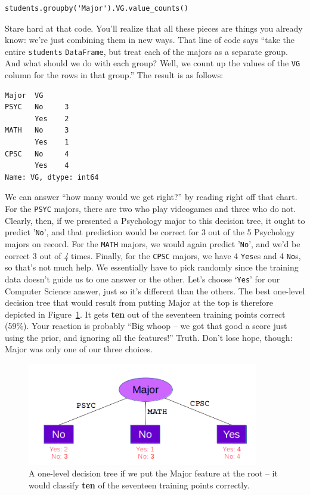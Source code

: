 \begin{Verbatim}[fontsize=\small,samepage=true,frame=single,framesep=3mm]
students.groupby('Major').VG.value_counts()
\end{Verbatim}

Stare hard at that code. You'll realize that all these pieces are things you
already know: we're just combining them in new ways. That line of code says
``take the entire \texttt{students} \texttt{DataFrame}, but treat each of the
majors as a separate group. And what should we do with each group? Well, we
count up the values of the \texttt{VG} column for the rows in that group.'' The
result is as follows:

\begin{Verbatim}[fontsize=\small,samepage=true,frame=leftline,framesep=5mm,framerule=1mm]
Major  VG 
PSYC   No     3
       Yes    2
MATH   No     3
       Yes    1
CPSC   No     4
       Yes    4
Name: VG, dtype: int64
\end{Verbatim}

We can answer ``how many would we get right?'' by reading right off that chart.
For the \texttt{PSYC} majors, there are two who play videogames and three who
do not. Clearly, then, if we presented a Psychology major to this decision
tree, it ought to predict '\texttt{No}', and that prediction would be correct
for 3 out of the 5 Psychology majors on record. For the \texttt{MATH} majors,
we would again predict '\texttt{No}', and we'd be correct 3 out of \textit{4}
times. Finally, for the \texttt{CPSC} majors, we have 4 \texttt{Yes}es and 4
\texttt{No}s, so that's not much help. We essentially have to pick randomly
since the training data doesn't guide us to one answer or the other. Let's
choose `\texttt{Yes}' for our Computer Science answer, just so it's different
than the others. The best one-level decision tree that would result from
putting \textsf{Major} at the top is therefore depicted in
Figure~\ref{fig:majorOnTop}. It gets \textbf{ten} out of the seventeen training
points correct (59\%). Your reaction is probably ``Big whoop -- we got that
good a score just using the prior, and ignoring all the features!'' Truth.
Don't lose hope, though: \textsf{Major} was only one of our three choices.

\begin{figure}[ht]
\centering
\includegraphics[width=0.9\textwidth]{majorOnTop.png}
\caption{A one-level decision tree if we put the \textsf{Major} feature at the
root -- it would classify \textbf{ten} of the seventeen training points
correctly.}
\label{fig:majorOnTop}
\end{figure}

